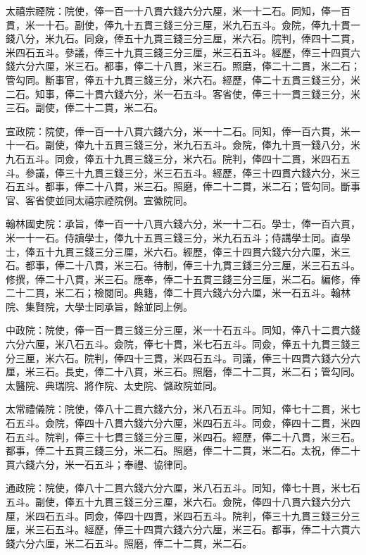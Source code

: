 \begin{pinyinscope}
 太禧宗禋院：院使，俸一百一十八貫六錢六分六厘，米一十二石。同知，俸一百貫，米一十石。副使，俸九十五貫三錢三分三厘，米九石五斗。僉院，俸九十貫一錢八分，米九石。同僉，俸五十九貫三錢三分三厘，米六石。院判，俸四十二貫，米四石五斗。參議，俸三十九貫三錢三分三厘，米三石五斗。經歷，俸三十四貫六錢六分六厘，米三石。都事，俸二十八貫，米三石。照磨，俸二十二貫，米二石；管勾同。斷事官，俸五十九貫三錢三分，米六石。經歷，俸二十五貫三錢三分，米二石。知事，俸二十貫六錢六分，米一石五斗。客省使，俸三十一貫三錢三分，米三石。副使，俸二十二貫，米二石。



 宣政院：院使，俸一百一十八貫六錢六分，米一十二石。同知，俸一百六貫，米一十一石。副使，俸九十五貫三錢三分，米九石五斗。僉院，俸九十貫一錢八分，米九石五斗。同僉，俸五十九貫三錢三分，米六石。院判，俸四十二貫，米四石五斗。參議，俸三十九貫三錢三分，米三石五斗。經歷，俸三十四貫六錢六分，米三石五斗。都事，俸二十八貫，米三石。照磨，俸二十二貫，米二石；管勾同。斷事官、客省使並同太禧宗禋院例。宣徽院同。



 翰林國史院：承旨，俸一百一十八貫六錢六分，米一十二石。學士，俸一百六貫，米一十一石。侍讀學士，俸九十五貫三錢三分，米九石五斗；侍講學士同。直學士，俸五十九貫三錢三分三厘，米六石。經歷，俸三十四貫六錢六分六厘，米三石。都事，俸二十八貫，米三石。待制，俸三十九貫三錢三分三厘，米三石五斗。修撰，俸二十八貫，米三石。應奉，俸二十五貫三錢三分三厘，米二石。編修，俸二十二貫，米二石；檢閱同。典籍，俸二十貫六錢六分六厘，米一石五斗。翰林院、集賢院，大學士同承旨，餘並同上例。



 中政院：院使，俸一百一貫三錢三分三厘，米一十石五斗。同知，俸八十二貫六錢六分六厘，米八石五斗。僉院，俸七十貫，米七石五斗。同僉，俸五十九貫三錢三分三厘，米六石。院判，俸四十三貫，米四石五斗。司議，俸三十四貫六錢六分六厘，米三石。長史，俸二十八貫，米三石。照磨，俸二十二貫，米二石；管勾同。太醫院、典瑞院、將作院、太史院、儲政院並同。



 太常禮儀院：院使，俸八十二貫六錢六分，米八石五斗。同知，俸七十二貫，米七石五斗。僉院，俸四十八貫六錢六分六厘，米四石五斗。同僉，俸四十二貫，米四石五斗。院判，俸三十七貫三錢三分三厘，米四石。經歷，俸二十八貫，米三石。都事，俸二十五貫三錢三分，米二石。照磨，俸二十二貫，米二石。太祝，俸二十貫六錢六分，米一石五斗；奉禮、協律同。



 通政院：院使，俸八十二貫六錢六分六厘，米八石五斗。同知，俸七十貫，米七石五斗。副使，俸五十九貫三錢三分三厘，米六石。僉院，俸四十八貫六錢六分六厘，米四石五斗。同僉，俸四十四貫，米四石五斗。院判，俸三十九貫三錢三分三厘，米三石五斗。經歷，俸三十四貫六錢六分六厘，米三石。都事，俸二十六貫六錢六分六厘，米二石五斗。照磨，俸二十二貫，米二石。




\end{pinyinscope}

